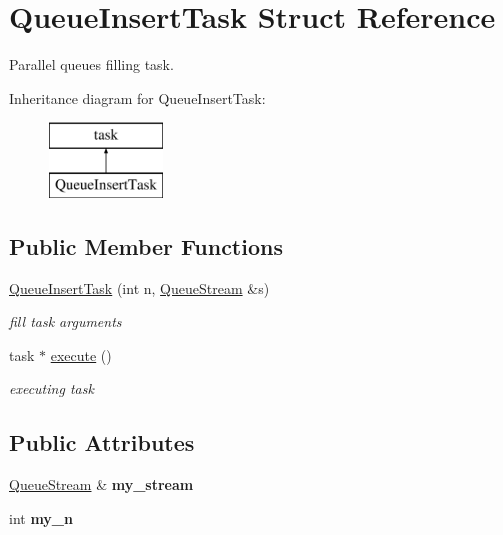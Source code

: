 \hypertarget{structQueueInsertTask}{}\section{Queue\+Insert\+Task Struct Reference}
\label{structQueueInsertTask}


Parallel queue\textquotesingle{}s filling task.  


Inheritance diagram for Queue\+Insert\+Task\+:\begin{figure}[H]
\begin{center}
\leavevmode
\includegraphics[height=2.000000cm]{structQueueInsertTask}
\end{center}
\end{figure}
\subsection*{Public Member Functions}
\begin{DoxyCompactItemize}
\item 
\hypertarget{structQueueInsertTask_a26fff4ff6766578e0ee6ff70e1a7446a}{}\hyperlink{structQueueInsertTask_a26fff4ff6766578e0ee6ff70e1a7446a}{Queue\+Insert\+Task} (int n, \hyperlink{structQueueStream}{Queue\+Stream} \&s)\label{structQueueInsertTask_a26fff4ff6766578e0ee6ff70e1a7446a}

\begin{DoxyCompactList}\small\item\em fill task arguments \end{DoxyCompactList}\item 
\hypertarget{structQueueInsertTask_ae60c6e7e75e3fbdec49bd0f4d5d2b203}{}task $\ast$ \hyperlink{structQueueInsertTask_ae60c6e7e75e3fbdec49bd0f4d5d2b203}{execute} ()\label{structQueueInsertTask_ae60c6e7e75e3fbdec49bd0f4d5d2b203}

\begin{DoxyCompactList}\small\item\em executing task \end{DoxyCompactList}\end{DoxyCompactItemize}
\subsection*{Public Attributes}
\begin{DoxyCompactItemize}
\item 
\hypertarget{structQueueInsertTask_a500e62610cbec2dc1a41e46c68872a20}{}\hyperlink{structQueueStream}{Queue\+Stream} \& {\bfseries my\+\_\+stream}\label{structQueueInsertTask_a500e62610cbec2dc1a41e46c68872a20}

\item 
\hypertarget{structQueueInsertTask_a53fbfe19748208f864325b2e155099a9}{}int {\bfseries my\+\_\+n}\label{structQueueInsertTask_a53fbfe19748208f864325b2e155099a9}

\end{DoxyCompactItemize}



